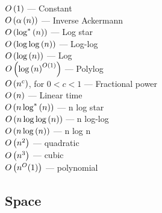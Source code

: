 \begin{description}

\item[$O\left({1}\right)$ --- Constant]

\item[$O\left({\alpha\left({n}\right)}\right)$ --- Inverse Ackermann]

\item[$O\left({\log^*{\left({n}\right)}}\right)$ --- Log star]

\item[$O\left({\log{\log{\ensuremath{\left({n}\right)}}}}\right)$ --- Log-log]

\item[$O\left({\log{\ensuremath{\left({n}\right)}}}\right)$ --- Log]

\item[$O\left({\log{\ensuremath{\left({n}\right)}^{\ensuremath{O\left({1}\right)}}}}\right)$ --- Polylog]

\item[$O\left({n^c}\right)$, for $0<c<1$ --- Fractional power]

\item[$O\left({n}\right)$ --- Linear time]

\item[$O\left({n\log^*{\left({n}\right)}}\right)$ --- n log star]

\item[$O\left({n\log{\log{\ensuremath{\left({n}\right)}}}}\right)$ --- n log-log]

\item[$O\left({n\log{\ensuremath{\left({n}\right)}}}\right)$ --- n log n]

\item[$O\left({n^2}\right)$ --- quadratic]

\item[$O\left({n^3}\right)$ --- cubic]

\item[$O\left({n^O(1)}\right)$ --- polynomial]

\end{description}

\subsection{Space}

